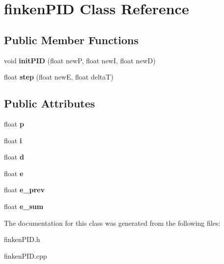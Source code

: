\hypertarget{classfinkenPID}{}\section{finken\+P\+ID Class Reference}
\label{classfinkenPID}
\subsection*{Public Member Functions}
\begin{DoxyCompactItemize}
\item 
void {\bfseries init\+P\+ID} (float newP, float newI, float newD)\hypertarget{classfinkenPID_aeb81b68dad305019abbd9c17c641aeaf}{}\label{classfinkenPID_aeb81b68dad305019abbd9c17c641aeaf}

\item 
float {\bfseries step} (float newE, float deltaT)\hypertarget{classfinkenPID_a89d4d494967f124d0772accf90da38e5}{}\label{classfinkenPID_a89d4d494967f124d0772accf90da38e5}

\end{DoxyCompactItemize}
\subsection*{Public Attributes}
\begin{DoxyCompactItemize}
\item 
float {\bfseries p}\hypertarget{classfinkenPID_a571224b8b2987d6f9b66324b19d23a7a}{}\label{classfinkenPID_a571224b8b2987d6f9b66324b19d23a7a}

\item 
float {\bfseries i}\hypertarget{classfinkenPID_ae30f53812eb9ce918ff7118f1ed0bc37}{}\label{classfinkenPID_ae30f53812eb9ce918ff7118f1ed0bc37}

\item 
float {\bfseries d}\hypertarget{classfinkenPID_a6c2bc535c7059f44f221d7e439fff219}{}\label{classfinkenPID_a6c2bc535c7059f44f221d7e439fff219}

\item 
float {\bfseries e}\hypertarget{classfinkenPID_a072d0522c05093becbd516058ba50357}{}\label{classfinkenPID_a072d0522c05093becbd516058ba50357}

\item 
float {\bfseries e\+\_\+prev}\hypertarget{classfinkenPID_a8a489dbad77576f5e36056ab8d510ea8}{}\label{classfinkenPID_a8a489dbad77576f5e36056ab8d510ea8}

\item 
float {\bfseries e\+\_\+sum}\hypertarget{classfinkenPID_ab336cafd17c6979c9da52a722af5cd4f}{}\label{classfinkenPID_ab336cafd17c6979c9da52a722af5cd4f}

\end{DoxyCompactItemize}


The documentation for this class was generated from the following files\+:\begin{DoxyCompactItemize}
\item 
finken\+P\+I\+D.\+h\item 
finken\+P\+I\+D.\+cpp\end{DoxyCompactItemize}
